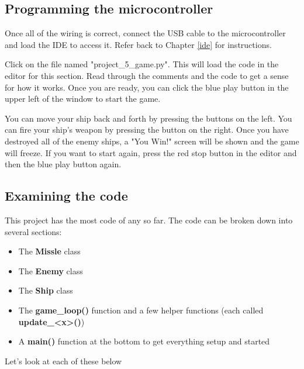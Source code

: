 \subsection{Programming the microcontroller}
Once all of the wiring is correct, connect the USB cable to the microcontroller and load the IDE to
access it. Refer back to Chapter \ref{ide} for instructions.

Click on the file named "project\_5\_game.py". This will load the code in the editor for this section. Read through the comments
and the code to get a sense for how it works. Once you are ready, you can click the blue play button in the upper left of the window
to start the game.

You can move your ship back and forth by pressing the buttons on the left. You can fire your ship's weapon by pressing the
button on the right. Once you have destroyed all of the enemy ships, a "You Win!" screen will be shown and the game will freeze.
If you want to start again, press the red stop button in the editor and then the blue play button again.

\subsection{Examining the code}

This project has the most code of any so far. The code can be broken down into several sections:
\begin{itemize}
    \item The \textbf{Missle} class
    \item The \textbf{Enemy} class
    \item The \textbf{Ship} class
    \item The \textbf{game\_loop()} function and a few helper functions (each called \textbf{update\_<x>()})
    \item A \textbf{main()} function at the bottom to get everything setup and started
\end{itemize}

Let's look at each of these below

